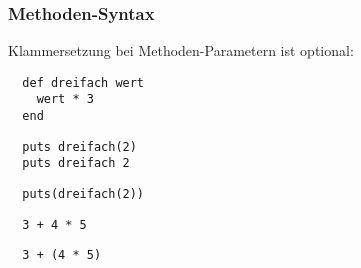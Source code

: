 \documentclass{beamer}
\begin{document}
\begin{frame}[fragile]
  \frametitle{Methoden-Syntax}
  Klammersetzung bei Methoden-Parametern ist optional:
  \begin{lstlisting}
  def dreifach wert 
    wert * 3
  end
  \end{lstlisting}
  \pause
  \begin{lstlisting}
  puts dreifach(2) 
  puts dreifach 2 
  \end{lstlisting}
  \pause
  \begin{lstlisting}
  puts(dreifach(2)) 
  \end{lstlisting}
  
  \pause
  \begin{lstlisting}
  3 + 4 * 5 
  \end{lstlisting}
  \pause
  \begin{lstlisting}
  3 + (4 * 5)
  \end{lstlisting}
\end{frame}
\end{document}
